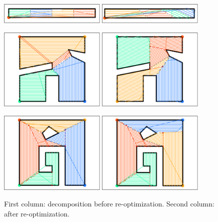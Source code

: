 \documentclass[../main.tex]{subfiles}
\begin{document}
\begin{figure}
		\centering
		\includegraphics[width=0.45\textwidth]{img/chapter_5/ID_1_orig.pdf}%
		\includegraphics[width=0.45\textwidth]{img/chapter_5/ID_1_reopt.pdf}

		\includegraphics[width=0.45\textwidth]{img/chapter_5/ID_2_orig.pdf}%
		\includegraphics[width=0.45\textwidth]{img/chapter_5/ID_2_reopt_c2_10.pdf}

		\includegraphics[width=0.45\textwidth]{img/chapter_5/ID_3_orig.pdf}%
		\includegraphics[width=0.45\textwidth]{img/chapter_5/ID_3_reopt_c2_10.pdf}

	\caption{First column: decomposition before re-optimization. Second column: after re-optimization.}
	\label{fig:decomposition_results}
\end{figure}
\end{document}
